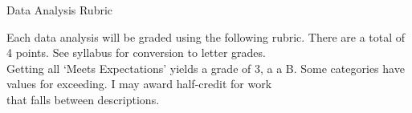 \documentclass{article}
\begin{document}
{\LARGE Data Analysis Rubric}

\vspace*{18pt}

\noindent
\hspace*{24pt} Each data analysis will be graded using the following rubric.
  There are a total of 4 points. See syllabus for conversion to letter grades. \\
\hspace*{24pt} Getting all `Meets Expectations' yields a grade of $3$, a
  a B. Some categories have values for exceeding. I may award half-credit for
  work \\
\hspace*{24pt}  that falls between descriptions.



\vspace*{18pt}
\end{document}

